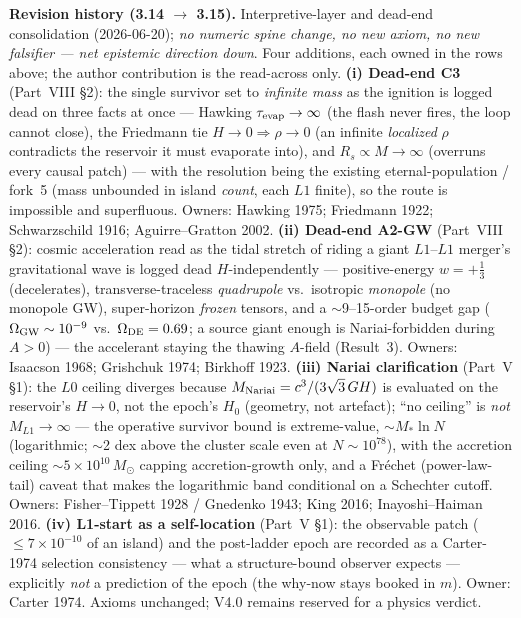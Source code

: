 \documentclass[11pt]{article}
\newcommand{\msun}{M_\odot}
\begin{document}
{\medskip
\noindent\textbf{Revision history (3.14 $\to$ 3.15).} Interpretive-layer and dead-end consolidation (2026-06-20); \emph{no numeric spine change, no new axiom, no new falsifier --- net epistemic direction down}. Four additions, each owned in the rows above; the author contribution is the read-across only. \textbf{(i) Dead-end C3} (Part~VIII \S2): the single survivor set to \emph{infinite mass} as the ignition is logged dead on three facts at once --- Hawking $\tau_{\rm evap}\to\infty$ (the flash never fires, the loop cannot close), the Friedmann tie $H\to0\Rightarrow\rho\to0$ (an infinite \emph{localized} $\rho$ contradicts the reservoir it must evaporate into), and $R_s\propto M\to\infty$ (overruns every causal patch) --- with the resolution being the existing eternal-population / fork~5 (mass unbounded in island \emph{count}, each $L1$ finite), so the route is impossible and superfluous. Owners: Hawking 1975; Friedmann 1922; Schwarzschild 1916; Aguirre--Gratton 2002. \textbf{(ii) Dead-end A2-GW} (Part~VIII \S2): cosmic acceleration read as the tidal stretch of riding a giant $L1$--$L1$ merger's gravitational wave is logged dead $H$-independently --- positive-energy $w=+\tfrac13$ (decelerates), transverse-traceless \emph{quadrupole} vs.\ isotropic \emph{monopole} (no monopole GW), super-horizon \emph{frozen} tensors, and a $\sim$9--15-order budget gap ($\Omega_{\rm GW}\sim10^{-9}$ vs.\ $\Omega_{\rm DE}=0.69$; a source giant enough is Nariai-forbidden during $A>0$) --- the accelerant staying the thawing $A$-field (Result~3). Owners: Isaacson 1968; Grishchuk 1974; Birkhoff 1923. \textbf{(iii) Nariai clarification} (Part~V \S1): the $L0$ ceiling diverges because $M_{\rm Nariai}=c^3/(3\sqrt3\,GH)$ is evaluated on the reservoir's $H\to0$, not the epoch's $H_0$ (geometry, not artefact); ``no ceiling'' is \emph{not} $M_{L1}\to\infty$ --- the operative survivor bound is extreme-value, $\sim M_*\ln N$ (logarithmic; $\sim$2 dex above the cluster scale even at $N\sim10^{78}$), with the accretion ceiling $\sim5\times10^{10}\,\msun$ capping accretion-growth only, and a Fr\'echet (power-law-tail) caveat that makes the logarithmic band conditional on a Schechter cutoff. Owners: Fisher--Tippett 1928 / Gnedenko 1943; King 2016; Inayoshi--Haiman 2016. \textbf{(iv) L1-start as a self-location} (Part~V \S1): the observable patch ($\le7\times10^{-10}$ of an island) and the post-ladder epoch are recorded as a Carter-1974 selection consistency --- what a structure-bound observer expects --- explicitly \emph{not} a prediction of the epoch (the why-now stays booked in $m$). Owner: Carter 1974. Axioms unchanged; V4.0 remains reserved for a physics verdict.

}
\end{document}
